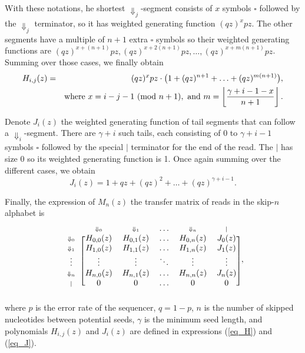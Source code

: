 \documentclass{article}
\newcommand{\Dn}[1]{\scriptstyle{\Downarrow_{#1}}}
\newcommand{\nd}{\scriptstyle{|}}
\newcommand{\modulo}[1]{\ (\mathrm{mod}\ #1)}
\begin{document}
With these notations, he shortest $\Downarrow_j$-segment consists of $x$
symbols $\square$ followed by the $\Downarrow_j$ terminator, so it has
weighted generating function $(qz)^xpz$. The other segments have a
multiple of $n+1$ extra $\square$ symbols so their weighted
generating functions are $(qz)^{x+(n+1)}pz, (qz)^{x+2(n+1)}pz, \ldots,
(qz)^{x+m(n+1)}pz$. Summing over those cases, we finally obtain
\begin{eqnarray}
\label{eq_H}
H_{i,j}(z) &=& (qz)^xpz \cdot \big( 1 + (qz)^{n+1} +
  \ldots + (qz)^{m(n+1)} \big), \\
\notag
  &\;& \text{where } x = i-j-1 \modulo{n+1},
  \text{ and } m = \left\lfloor
  \frac{\gamma+i-1-x}{n+1} \right\rfloor.
\end{eqnarray}

Denote $J_i(z)$ the weighted generating function of tail segments that can
follow a $\Downarrow_i$-segment. There are $\gamma+i$ such tails, each
consisting of 0 to $\gamma+i-1$ symbols $\square$ followed by the special
$|$ terminator for the end of the read. The $|$ has size 0 so its weighted
generating function is 1. Once again summing over the different cases, we
obtain
\begin{equation}
\label{eq_J}
J_i(z) = 1 + qz + (qz)^2 + \ldots + (qz)^{\gamma+i-1}.
\end{equation}

Finally, the expression of $M_n(z)$ the transfer matrix of reads in the
skip-$n$ alphabet is
\begin{equation}
\label{eq_matrix_Mn}
\begin{blockarray}{cccccc}
   & \Dn{0} & \Dn{1} & \ldots & \Dn{n} & \nd \\
\begin{block}{c[ccccc]}
\Dn{0} & H_{0,0}(z) & H_{0,1}(z) & \ldots & H_{0,n}(z) & J_0(z) \\
\Dn{1} & H_{1,0}(z) & H_{1,1}(z) & \ldots & H_{1,n}(z) & J_1(z) \\
\vdots & \vdots & \vdots & \ddots & \vdots & \vdots \\
\Dn{n} & H_{n,0}(z) & H_{n,1}(z) & \ldots & H_{n,n}(z) & J_n(z) \\
\nd & 0 & 0 & \ldots & 0 & 0 \\
\end{block}
\end{blockarray},
\end{equation}
where $p$ is the error rate of the sequencer, $q=1-p$, $n$ is the number of
skipped nucleotides between potential seeds, $\gamma$ is the minimum seed
length, and polynomials $H_{i,j}(z)$ and $J_i(z)$ are defined in
expressions (\ref{eq_H}) and (\ref{eq_J}).
\end{document}
